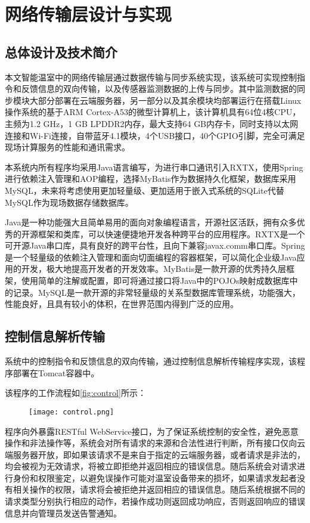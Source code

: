 \section{网络传输层设计与实现}
	\subsection{总体设计及技术简介}
	本文智能温室中的网络传输层通过数据传输与同步系统实现，该系统可实现控制指令和反馈信息的双向传输，以及传感器监测数据的上传与同步。其中监测数据的同步模块大部分部署在云端服务器，另一部分以及其余模块均部署运行在搭载Linux操作系统的基于ARM Cortex-A53的微型计算机上，该计算机具有64位4核CPU，主频为1.2 GHz，1 GB LPDDR2内存，最大支持64 GB内存卡，同时支持以太网连接和Wi-Fi连接，自带蓝牙4.1模块，4个USB接口，40个GPIO引脚，完全可满足现场计算服务的性能和通讯需求。
	
本系统内所有程序均采用Java语言编写，为进行串口通讯引入RXTX，使用Spring进行依赖注入管理和AOP编程，选择MyBatis作为数据持久化框架，数据库采用MySQL，未来将考虑使用更加轻量级、更加适用于嵌入式系统的SQLite代替MySQL作为现场数据存储数据库。

Java是一种功能强大且简单易用的面向对象编程语言，开源社区活跃，拥有众多优秀的开源框架和类库，可以快速便捷地开发各种跨平台的应用程序。RXTX是一个可开源Java串口库，具有良好的跨平台性，且向下兼容javax.comm串口库。Spring是一个轻量级的依赖注入管理和面向切面编程的容器框架，可以简化企业级Java应用的开发，极大地提高开发者的开发效率。MyBatis是一款开源的优秀持久层框架，使用简单的注解或配置，即可将通过接口将Java中的POJOs映射成数据库中的记录。MySQL是一款开源的非常轻量级的关系型数据库管理系统，功能强大，性能良好，且具有较小的体积，在世界范围内得到广泛的应用。

	\subsection{控制信息解析传输}
系统中的控制指令和反馈信息的双向传输，通过控制信息解析传输程序实现，该程序部署在Tomcat容器中。
	
该程序的工作流程如\ref{fig:control}所示：
	\begin{figure}[!htp]
		\centering
		\texttt{[image: control.png]}
	\end{figure}
程序向外暴露RESTful WebService接口，为了保证系统控制的安全性，避免恶意操作和非法操作等，系统会对所有请求的来源和合法性进行判断，所有接口仅向云端服务器开放，即如果该请求不是来自于指定的云端服务器，或者请求是非法的，均会被视为无效请求，将被立即拒绝并返回相应的错误信息。随后系统会对请求进行身份和权限鉴定，以避免误操作可能对温室设备带来的损坏，如果请求发起者没有相关操作的权限，请求将会被拒绝并返回相应的错误信息。随后系统根据不同的请求类型分别执行相应的动作，若操作成功则返回成功响应，否则返回响应的错误信息并向管理员发送告警通知。

